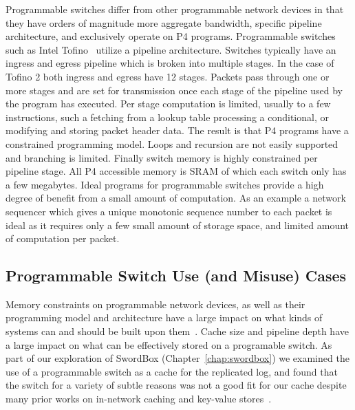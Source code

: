 \documentclass[12pt]{ucsddissertation}
\newcommand{\sword}{SwordBox}
\begin{document}
Programmable switches differ from other programmable network devices in that they have orders of
magnitude more aggregate bandwidth, specific pipeline architecture, and exclusively operate on P4
programs.
Programmable switches such as Intel Tofino~\cite{tofino2} utilize a pipeline architecture. Switches
typically have an ingress and egress pipeline which is broken into multiple stages. In the case of
Tofino 2 both ingress and egress have 12 stages. Packets pass through one or more stages and are set
for transmission once each stage of the pipeline used by the program has executed. Per stage
computation is limited, usually to a few instructions, such a fetching from a lookup table
processing a conditional, or modifying and storing packet header data. The result is that P4
programs have a constrained programming model. Loops and recursion are not easily supported and
branching is limited. Finally switch memory is highly constrained per pipeline stage. All P4
accessible memory is SRAM of which each switch only has a few megabytes.
Ideal programs for programmable switches provide a high degree of benefit from a small amount of
computation. As an example a network sequencer which gives a unique monotonic sequence number to
each packet is ideal as it requires only a few small amount of storage space, and limited amount of
computation per packet.

\subsection{Programmable Switch Use (and Misuse) Cases}

Memory constraints on programmable network devices, as well as their programming model and
architecture have a large impact on what kinds of systems can and should be built upon
them~\cite{when-computer}. Cache size and pipeline depth have a large impact on what can be
effectively stored on a programable switch. As part of our exploration of {\sword}
(Chapter~\ref{chap:swordbox}) we examined the use of a programmable switch as a cache for the
replicated log, and found that the switch for a variety of subtle reasons was not a good fit for our
cache despite many prior works on in-network caching and key-value
stores~\cite{netcache,netchain,netkv,netlock}.
\end{document}
